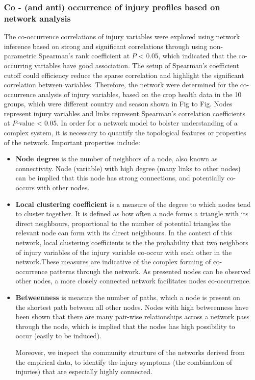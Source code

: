 



\subsubsection*{Co - (and anti) occurrence of injury profiles based on network analysis}

The co-occurrence correlations of injury variables were explored using network inference based on strong and significant correlations through using non-parametric Spearman’s rank coefficient at $P$ < 0.05, which indicated that the co-occurring variables have good association. The setup of Spearman's coefficient cutoff could efficiency reduce the sparse correlation and highlight the significant correlation between variables. Therefore, the network were determined for the co-occurrence analysis of injury variables, based on the crop health data in the 10 groups, which were different country and season shown in Fig to Fig. Nodes represent injury variables  and links represent Spearman's correlation coefficients at $P$-value < 0.05. In order for a network model to bolster understanding of a complex system, it is necessary to quantify the topological features or properties of the network. Important properties include:

\begin{itemize}
\item \textbf{Node degree} is the number of neighbors of a node, also known as connectivity. Node (variable) with high degree (many links to other nodes) can be implied that this node has strong connections, and  potentially co-occurs with other nodes. 

\item \textbf{Local clustering coefficient} is a measure of the degree to which nodes tend to cluster together. It is defined as how often a node forms a triangle with its direct neighbours, proportional to the number of potential triangles the relevant node can form with its direct neighbours. In the context of this network, local clustering coefficients is the the probability that two neighbors of  injury variables of the injury variable co-occur with each other in the network.These measures are indicative of the complex forming of co-occurrence patterns through the network. As presented nodes can be observed other nodes, a more closely connected network facilitates nodes co-occurrence.

\item \textbf{Betweenness} is measure the number of paths, which a node is present on the shortest path between all other nodes. Nodes with high betweenness have been shown that there are many pair-wise relationships across a network pass through the node, which is implied that the nodes has high possibility to occur (easily to be induced). 

Moreover, we inspect the community structure of the networks derived from the empirical data, to identify the injury symptoms (the combination of injuries) that are especially highly connected.

\end{itemize}


